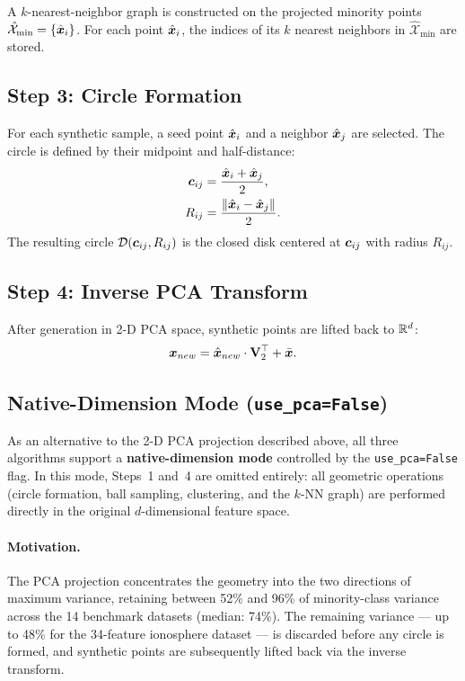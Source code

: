 A $k$-nearest-neighbor graph is constructed on the projected minority points $\hat{\mathcal{X}}_{\min} = \{\hat{\bm{x}}_i\}$.
For each point $\hat{\bm{x}}_i$, the indices of its $k$ nearest neighbors in $\hat{\mathcal{X}}_{\min}$ are stored.

\subsection{Step 3: Circle Formation}

For each synthetic sample, a seed point $\hat{\bm{x}}_i$ and a neighbor $\hat{\bm{x}}_j$ are selected.
The circle is defined by their midpoint and half-distance:
\begin{align}
    \bm{c}_{ij} &= \frac{\hat{\bm{x}}_i + \hat{\bm{x}}_j}{2}, \label{eq:circle_center}\\
    R_{ij}   &= \frac{\|\hat{\bm{x}}_i - \hat{\bm{x}}_j\|}{2}. \label{eq:circle_radius}
\end{align}
The resulting circle $\mathcal{D}(\bm{c}_{ij}, R_{ij})$ is the closed disk centered at $\bm{c}_{ij}$ with radius $R_{ij}$.

\subsection{Step 4: Inverse PCA Transform}

After generation in 2-D PCA space, synthetic points are lifted back to $\mathbb{R}^d$:
\begin{equation}
    \bm{x}_{new} = \hat{\bm{x}}_{new} \cdot \mathbf{V}_2^\top + \bar{\bm{x}}.
    \label{eq:inverse_pca}
\end{equation}

\subsection{Native-Dimension Mode (\texttt{use\_pca=False})}
\label{sec:methods:nopca}

As an alternative to the 2-D PCA projection described above, all three algorithms support a \textbf{native-dimension mode} controlled by the \texttt{use\_pca=False} flag.
In this mode, Steps~1 and~4 are omitted entirely: all geometric operations (circle formation, ball sampling, clustering, and the $k$-NN graph) are performed directly in the original $d$-dimensional feature space.

\paragraph{Motivation.}
The PCA projection concentrates the geometry into the two directions of maximum variance, retaining between 52\% and 96\% of minority-class variance across the 14 benchmark datasets (median: 74\%).
The remaining variance — up to 48\% for the 34-feature ionosphere dataset — is discarded before any circle is formed, and synthetic points are subsequently lifted back via the inverse transform.

